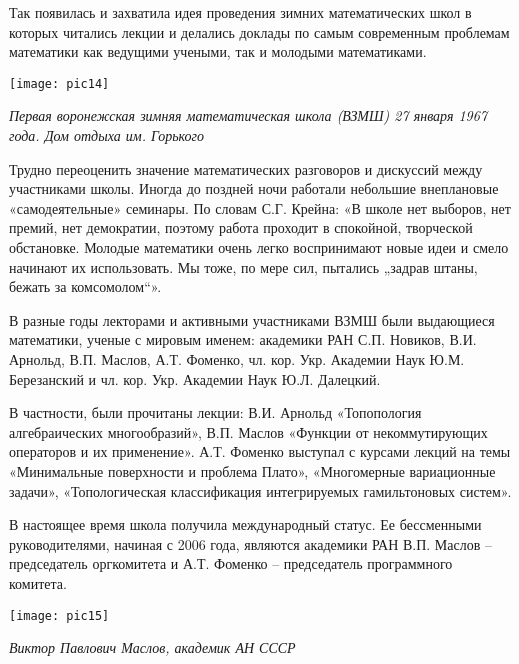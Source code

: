 Так появилась и захватила идея проведения зимних математических школ в которых читались лекции и делались доклады по самым современным проблемам математики как ведущими учеными, так и молодыми математиками.


\begin{center}

\texttt{[image: pic14]}


{\it Первая воронежская зимняя математическая школа (ВЗМШ)
27 января 1967 года. Дом отдыха им. Горького}
\end{center}

Трудно переоценить значение математических разговоров и дискуссий между участниками школы. Иногда до поздней ночи работали небольшие внеплановые «самодеятельные» семинары. По словам С.Г. Крейна: «В школе нет выборов, нет премий, нет демократии, поэтому работа проходит в спокойной, творческой обстановке. Молодые математики очень легко воспринимают новые идеи и смело начинают их использовать. Мы тоже, по мере сил, пытались „задрав штаны, бежать за комсомолом“».

В разные годы лекторами и активными участниками ВЗМШ были выдающиеся математики, ученые с мировым именем: академики РАН С.П. Новиков, В.И. Арнольд, В.П. Маслов, А.Т. Фоменко, чл. кор. Укр. Академии Наук Ю.М. Березанский и чл. кор. Укр. Академии Наук Ю.Л. Далецкий.

В частности, были прочитаны лекции: В.И. Арнольд «Топопология алгебраических многообразий», В.П. Маслов «Функции от некоммутирующих операторов и их применение». А.Т. Фоменко выступал с курсами лекций на темы «Минимальные поверхности и проблема Плато», «Многомерные вариационные задачи», «Топологическая классификация интегрируемых гамильтоновых систем».

В настоящее время школа получила международный статус.  Ее бессменными руководителями, начиная с 2006 года, являются академики РАН В.П. Маслов – председатель оргкомитета и А.Т. Фоменко – председатель программного комитета.

\begin{center}

\texttt{[image: pic15]}


{\it Виктор Павлович Маслов, академик АН СССР}
\end{center}

